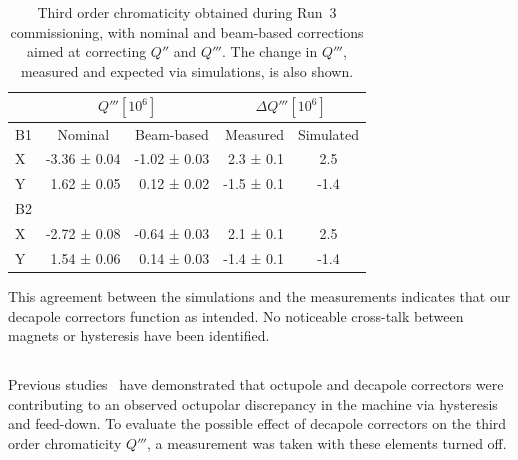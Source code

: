 \begin{table}[tbh]
    \centering
    \begin{tabular}{|l||r|r|r|c|}
    \hline
              &  \multicolumn{2}{c|}{$Q''' [10^6]$}  &  \multicolumn{2}{c|}{$\Delta Q''' [10^6]$}\\ \hline\hline
        B1    &   \multicolumn{1}{c|}{Nominal}     &   \multicolumn{1}{c|}{Beam-based}   & Measured & Simulated \\
        X     &  -3.36 ± 0.04 &  -1.02 ± 0.03  &  2.3 ± 0.1 &   2.5 \\
        Y     &   1.62 ± 0.05 &   0.12 ± 0.02  & -1.5 ± 0.1 &  -1.4 \\ \hline
        B2    &               &&& \\
        X     &  -2.72 ± 0.08 &  -0.64 ± 0.03  &  2.1 ± 0.1 &  2.5\\
        Y     &   1.54 ± 0.06 &   0.14 ± 0.03  & -1.4 ± 0.1 & -1.4\\ \hline
    \end{tabular}
    \caption{Third order chromaticity obtained during Run~3 commissioning, with nominal and
    beam-based corrections aimed at correcting $Q''$ and $Q'''$.
    The change in $Q'''$, measured and expected via simulations, is also shown.} 
    \label{table:decapoles:chromaticity:dq3_before_after_beam_based}
\end{table}


This agreement between the simulations and the measurements indicates that our decapole correctors
function as intended. No noticeable cross-talk between magnets or hysteresis have been identified.


\subsection{}


Previous studies~\cite{maclean_measurement_2014} have demonstrated that octupole and decapole
correctors were contributing to an observed octupolar discrepancy in the machine via hysteresis and
feed-down. To evaluate the possible effect of decapole correctors on the third order chromaticity
$Q'''$, a measurement was taken with these elements turned off.

